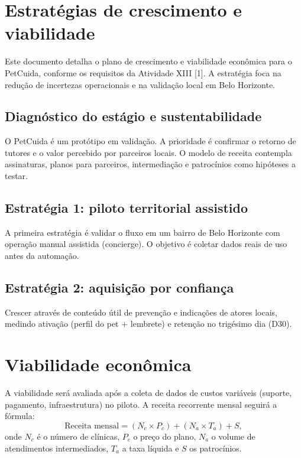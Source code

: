 \documentclass[12pt,a4paper]{article}
\begin{document}
\tableofcontents
\clearpage
{}

\section{Estratégias de crescimento e viabilidade}

Este documento detalha o plano de crescimento e viabilidade econômica para o PetCuida, conforme os requisitos da Atividade XIII [1]. A estratégia foca na redução de incertezas operacionais e na validação local em Belo Horizonte.

\subsection{Diagnóstico do estágio e sustentabilidade}

O PetCuida é um protótipo em validação. A prioridade é confirmar o retorno de tutores e o valor percebido por parceiros locais. O modelo de receita contempla assinaturas, planos para parceiros, intermediação e patrocínios como hipóteses a testar.

\subsection{Estratégia 1: piloto territorial assistido}

A primeira estratégia é validar o fluxo em um bairro de Belo Horizonte com operação manual assistida (concierge). O objetivo é coletar dados reais de uso antes da automação.

\subsection{Estratégia 2: aquisição por confiança}

Crescer através de conteúdo útil de prevenção e indicações de atores locais, medindo ativação (perfil do pet + lembrete) e retenção no trigésimo dia (D30).

\section{Viabilidade econômica}

A viabilidade será avaliada após a coleta de dados de custos variáveis (suporte, pagamento, infraestrutura) no piloto. A receita recorrente mensal seguirá a fórmula:
\[
\text{Receita mensal} = (N_c \times P_c) + (N_a \times T_a) + S,
\]
onde $N_c$ é o número de clínicas, $P_c$ o preço do plano, $N_a$ o volume de atendimentos intermediados, $T_a$ a taxa líquida e $S$ os patrocínios.
\end{document}
